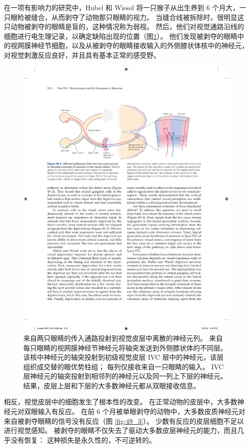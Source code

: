 在一项有影响力的研究中，Hubel 和 Wiesel 将一只猴子从出生养到 6 个月大，一只眼睑被缝合，从而剥夺了动物那只眼睛的视力。
当缝合线被拆除时，很明显这只动物被剥夺的眼睛是盲的，这种情况称为弱视。
然后，他们对视觉通路沿线的细胞进行电生理记录，以确定缺陷出现的位置（图\ref{fig:49_2}）。
他们发现被剥夺的眼睛中的视网膜神经节细胞，以及从被剥夺的眼睛接收输入的外侧膝状体核中的神经元，对视觉刺激反应良好，并且具有基本正常的感受野。


\begin{figure}[htbp]
	\centering
	\includegraphics[width=0.8\linewidth]{chap49/fig_49_2}
	\caption{来自两只眼睛的传入通路投射到视觉皮层中离散的神经元列。 来自每只眼睛的视网膜神经节神经元将轴突发送到外侧膝状体的不同层。 该核中神经元的轴突投射到初级视觉皮层 IVC 层中的神经元，该层组织成交替的眼优势柱组； 每列仅接收来自一只眼睛的输入。 IVC 层神经元的轴突投射到相邻列的神经元以及同一列上下层的神经元。 结果，皮层上层和下层的大多数神经元都从双眼接收信息。}
	\label{fig:49_2}
\end{figure}


相反，视觉皮层中的细胞发生了根本性的改变。 在正常动物的皮层中，大多数神经元对双眼输入有反应。
在前 6 个月被单眼剥夺的动物中，大多数皮质神经元对来自被剥夺眼睛的信号没有反应（图 \ref{fig:49_3}）。
少数有反应的皮层细胞不足以进行视觉感知。
被剥夺的眼睛不仅失去了驱动大多数皮层神经元的能力，而且几乎没有恢复：
这种损失是永久性的，不可逆转的。


